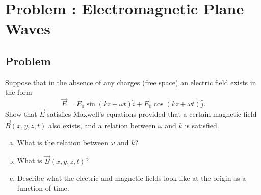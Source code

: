 \documentclass[solutions]{esg8022pset}
\begin{document}
\section{Problem \thesection: Electromagnetic Plane Waves}
\subsection{Problem}
  Suppose that in the absence of any charges (free
  space) an electric field exists in the form
  $$\vec E = E_0\sin(kz + \omega t) \hat i + E_0 \cos(kz + \omega t) \hat j.$$
  Show that $\vec E$ satisfies Maxwell's equations provided that a certain magnetic field $\vec B(x,y,z,t)$
  also exists, and a relation between $\omega$ and $k$ is satisfied.
  \begin{enumerate}[(a)]
    \item What is the relation between $\omega$ and $k$?
    \item What is $\vec B(x,y,z,t)$?
    \item Describe what the electric and magnetic fields look like at the origin as a function of
    time.
  \end{enumerate}
\end{document}
